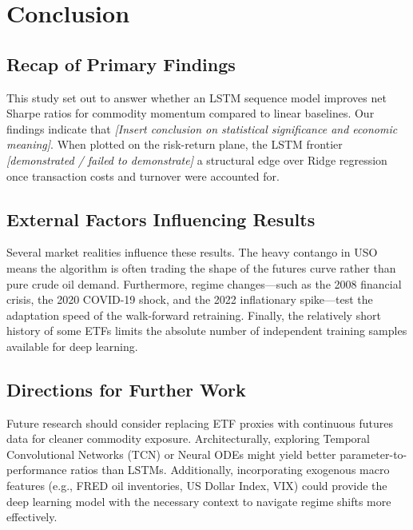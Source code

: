 \documentclass[a4paper,oneside]{scrbook}
\begin{document}
\section{Conclusion}

\subsection{Recap of Primary Findings}
This study set out to answer whether an LSTM sequence model improves net Sharpe ratios for commodity momentum compared to linear baselines. Our findings indicate that \textit{[Insert conclusion on statistical significance and economic meaning]}. When plotted on the risk-return plane, the LSTM frontier \textit{[demonstrated / failed to demonstrate]} a structural edge over Ridge regression once transaction costs and turnover were accounted for.

\subsection{External Factors Influencing Results}
Several market realities influence these results. The heavy contango in USO means the algorithm is often trading the shape of the futures curve rather than pure crude oil demand. Furthermore, regime changes—such as the 2008 financial crisis, the 2020 COVID-19 shock, and the 2022 inflationary spike—test the adaptation speed of the walk-forward retraining. Finally, the relatively short history of some ETFs limits the absolute number of independent training samples available for deep learning.

\subsection{Directions for Further Work}
Future research should consider replacing ETF proxies with continuous futures data for cleaner commodity exposure. Architecturally, exploring Temporal Convolutional Networks (TCN) or Neural ODEs might yield better parameter-to-performance ratios than LSTMs. Additionally, incorporating exogenous macro features (e.g., FRED oil inventories, US Dollar Index, VIX) could provide the deep learning model with the necessary context to navigate regime shifts more effectively.
\end{document}
